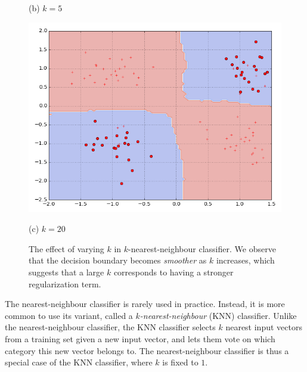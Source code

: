 \documentclass{report}
\begin{document}
\begin{figure}[t]
\begin{minipage}{0.32\textwidth}
        (b) $k=5$
    \end{minipage}
    \hfill
    \begin{minipage}{0.32\textwidth}
        \centering
        \includegraphics[width=\columnwidth]{figures/knn_20.png}

        (c) $k=20$
    \end{minipage}

    \caption{
        \label{fig:knn}
        The effect of varying $k$ in $k$-nearest-neighbour classifier. We
        observe that the decision boundary becomes {\it smoother} as $k$
        increases, which suggests that a large $k$ corresponds to having a
        stronger regularization term.
    }
\end{figure}

The nearest-neighbour classifier is rarely used in practice. Instead, it is more
common to use its variant, called a {\it $k$-nearest-neighbour} (KNN)
classifier.  Unlike the nearest-neighbour classifier, the KNN classifier selects
$k$ nearest input vectors from a training set given a new input vector, and lets
them vote on which category this new vector belongs to. The nearest-neighbour
classifier is thus a special case of the KNN classifier, where $k$ is fixed to
$1$. 
\end{document}
